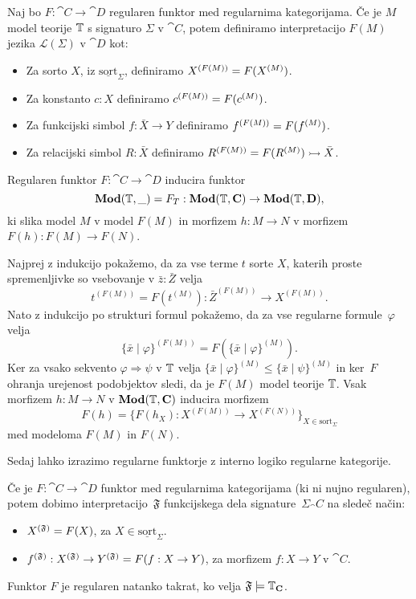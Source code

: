 \documentclass[../kategoricna_logika.tex]{subfiles}
\begin{document}
\begin{definicija}
  Naj bo $F : \cat{C} \to \cat{D}$ regularen funktor med regularnima
  kategorijama.  Če je $M$ model teorije $\T$ s signaturo $\Sigma$ v $\cat{C}$, potem definiramo interpretacijo
  $F(M)$ jezika $\mathcal{L}(\Sigma)$ v $\cat{D}$ kot:
  \begin{itemize}
  \item Za sorto $X$, iz $\underline{\mathrm{sort}}_\Sigma$,
    definiramo $\interp[F(M)]{X} = F(\interp{X})$.
  \item Za konstanto $c:X$ definiramo
    $\interp[F(M)]{c} = F(\interp{c})$.
  \item Za funkcijski simbol $f : \bar{X} \to Y$ definiramo
    $\interp[F(M)]{f} = F(\interp{f})$.
  \item Za relacijski simbol $R : \bar{X}$ definiramo
    $\interp[F(M)]{R} = F(\interp{R}) \rightarrowtail \bar{X}$.
  \end{itemize}
\end{definicija}
\begin{lema}\label{lema:regularen-funktor-slika-model-v-model}
  Regularen funktor $F : \cat{C} \to \cat{D}$ inducira funktor
  $$\Mod(\T, \_)=F_T : \Mod(\T,\cat{C}) \to \Mod(\T, \cat{D}),$$
  ki slika model $M$ v model $F(M)$ in morfizem $h : M \to N$ v
  morfizem $F(h) : F(M) \to F(N)$.
\end{lema}
\begin{dokaz}
  Najprej z indukcijo pokažemo, da za vse terme $t$ sorte $X$, katerih
  proste spremenljivke so vsebovanje v $\bar{z} : \bar{Z}$ velja
  \[ t^{(F(M))} = F(t^{(M)}) : \bar{Z}^{(F(M))} \to X^{(F(M))}.\] Nato
  z indukcijo po strukturi formul pokažemo, da za vse regularne
  formule~$\varphi$ velja
  \[ \{ \bar{x} \mid \varphi\}^{(F(M))} = F(\{\bar{x} \mid \varphi
    \}^{(M)}).\] Ker za vsako sekvento $\varphi \Rightarrow \psi$ v
  $\T$ velja
  $\{\bar{x} \mid \varphi\}^{(M)} \leq \{\bar{x} \mid \psi \}^{(M)}$
  in ker~$F$ ohranja urejenost podobjektov sledi, da je $F(M)$ model
  teorije $\T$. Vsak morfizem $h : M \to N$ v $\Mod(\T, \cat{C})$
  inducira morfizem
  \[ F(h) = \{ F(h_X) : X^{(F(M))} \to X^{(F(N))}\}_{X \in
      \mathrm{sort}_{\Sigma}}\] med modeloma $F(M)$ in $F(N)$.
\end{dokaz}
Sedaj lahko izrazimo regularne funktorje z interno
logiko regularne kategorije.
\begin{lema}\label{lema:regularen-funktor-v-interni-logiki}
  Če je $F : \cat{C} \to \cat{D}$ funktor med regularnima kategorijama
  (ki ni nujno regularen), potem dobimo interpretacijo~$\mathfrak{F}$
  funkcijskega dela signature~$\Sigma_\cat{C}$ na sledeč način:
  \begin{itemize}
  \item $\interp[\mathfrak{F}]{X} = F(X)$, za
    $X \in \underline{\mathrm{sort}}_{\Sigma}$.
  \item
    $\interp[\mathfrak{F}]{f} : \interp[\mathfrak{F}]{X} \to
    \interp[\mathfrak{F}]{Y} = F(f : X \to Y)$, za morfizem
    $f: X \to Y$ v $\cat{C}$.
  \end{itemize}
  Funktor $F$ je regularen natanko takrat, ko velja
  $\mathfrak{F} \models \T_\cat{C}$.
\end{lema}
\end{document}
